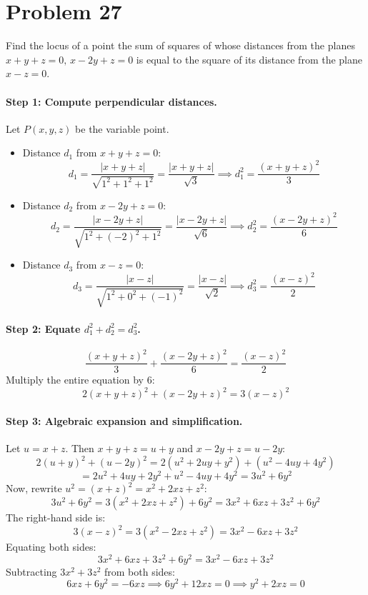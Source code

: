 \documentclass[11pt,a4paper]{article}
\begin{document}
\section{Problem 27}
\begin{problembox}[Problem 27]
Find the locus of a point the sum of squares of whose distances from the planes $x + y + z = 0, \, x - 2y + z = 0$ is equal to the square of its distance from the plane $x - z = 0$.
\end{problembox}

\paragraph{Step 1: Compute perpendicular distances.}
Let $P(x, y, z)$ be the variable point.
\begin{itemize}
    \item Distance $d_1$ from $x + y + z = 0$:
    $$d_1 = \frac{|x + y + z|}{\sqrt{1^2 + 1^2 + 1^2}} = \frac{|x + y + z|}{\sqrt{3}} \implies d_1^2 = \frac{(x + y + z)^2}{3}$$
    \item Distance $d_2$ from $x - 2y + z = 0$:
    $$d_2 = \frac{|x - 2y + z|}{\sqrt{1^2 + (-2)^2 + 1^2}} = \frac{|x - 2y + z|}{\sqrt{6}} \implies d_2^2 = \frac{(x - 2y + z)^2}{6}$$
    \item Distance $d_3$ from $x - z = 0$:
    $$d_3 = \frac{|x - z|}{\sqrt{1^2 + 0^2 + (-1)^2}} = \frac{|x - z|}{\sqrt{2}} \implies d_3^2 = \frac{(x - z)^2}{2}$$
\end{itemize}

\paragraph{Step 2: Equate $d_1^2 + d_2^2 = d_3^2$.}
$$\frac{(x + y + z)^2}{3} + \frac{(x - 2y + z)^2}{6} = \frac{(x - z)^2}{2}$$
Multiply the entire equation by $6$:
$$2(x + y + z)^2 + (x - 2y + z)^2 = 3(x - z)^2$$

\paragraph{Step 3: Algebraic expansion and simplification.}
Let $u = x + z$. Then $x + y + z = u + y$ and $x - 2y + z = u - 2y$:
$$2(u + y)^2 + (u - 2y)^2 = 2(u^2 + 2uy + y^2) + (u^2 - 4uy + 4y^2)$$
$$= 2u^2 + 4uy + 2y^2 + u^2 - 4uy + 4y^2 = 3u^2 + 6y^2$$
Now, rewrite $u^2 = (x + z)^2 = x^2 + 2xz + z^2$:
$$3u^2 + 6y^2 = 3(x^2 + 2xz + z^2) + 6y^2 = 3x^2 + 6xz + 3z^2 + 6y^2$$
The right-hand side is:
$$3(x - z)^2 = 3(x^2 - 2xz + z^2) = 3x^2 - 6xz + 3z^2$$
Equating both sides:
$$3x^2 + 6xz + 3z^2 + 6y^2 = 3x^2 - 6xz + 3z^2$$
Subtracting $3x^2 + 3z^2$ from both sides:
$$6xz + 6y^2 = -6xz \implies 6y^2 + 12xz = 0 \implies y^2 + 2xz = 0$$
\end{document}
